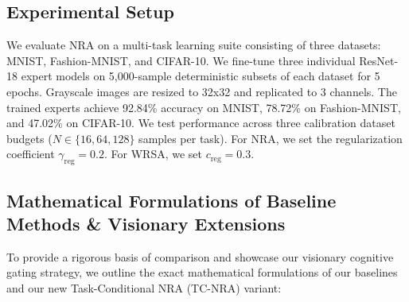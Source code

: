 \documentclass{article}
\theoremstyle{plain}
\theoremstyle{definition}
\theoremstyle{remark}
\begin{document}
\subsection{Experimental Setup}
We evaluate NRA on a multi-task learning suite consisting of three datasets: MNIST, Fashion-MNIST, and CIFAR-10. We fine-tune three individual ResNet-18 expert models on 5,000-sample deterministic subsets of each dataset for 5 epochs. Grayscale images are resized to 32x32 and replicated to 3 channels. The trained experts achieve 92.84\% accuracy on MNIST, 78.72\% on Fashion-MNIST, and 47.02\% on CIFAR-10. We test performance across three calibration dataset budgets ($N \in \{16, 64, 128\}$ samples per task). For NRA, we set the regularization coefficient $\gamma_{\text{reg}} = 0.2$. For WRSA, we set $c_{\text{reg}} = 0.3$.

\subsection{Mathematical Formulations of Baseline Methods \& Visionary Extensions}
To provide a rigorous basis of comparison and showcase our visionary cognitive gating strategy, we outline the exact mathematical formulations of our baselines and our new Task-Conditional NRA (TC-NRA) variant:
\end{document}
